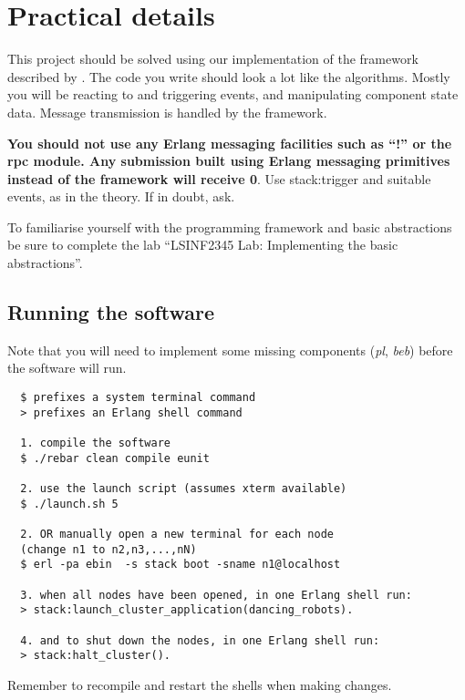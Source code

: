 \documentclass[a4paper]{article}
\begin{document}
\section*{Practical details} %
\label{sec:practical_details}

This project should be solved using our implementation of the framework
described by \cite{cachin2011}. The code you write should look a lot like the
algorithms. Mostly you will be reacting to and triggering events, and
manipulating component state data. Message transmission is handled by the
framework.

\textbf{You should not use any Erlang messaging facilities such as ``!'' or the rpc
module. Any submission built using Erlang messaging primitives
instead of the framework will receive 0}. Use stack:trigger
and suitable events, as in the theory. If in doubt, ask.

To familiarise yourself with the programming framework and basic abstractions
be sure to complete the lab ``LSINF2345 Lab: Implementing the basic
abstractions''.

\subsection*{Running the software} %
\label{sub:running_the_software}

Note that you will need to implement some missing components (\emph{pl},
\emph{beb}) before the software will run.

\begin{verbatim}
  $ prefixes a system terminal command
  > prefixes an Erlang shell command

  1. compile the software
  $ ./rebar clean compile eunit

  2. use the launch script (assumes xterm available)
  $ ./launch.sh 5

  2. OR manually open a new terminal for each node
  (change n1 to n2,n3,...,nN)
  $ erl -pa ebin  -s stack boot -sname n1@localhost

  3. when all nodes have been opened, in one Erlang shell run:
  > stack:launch_cluster_application(dancing_robots).

  4. and to shut down the nodes, in one Erlang shell run:
  > stack:halt_cluster().
\end{verbatim}

Remember to recompile and restart the shells when making changes.

\end{document}
